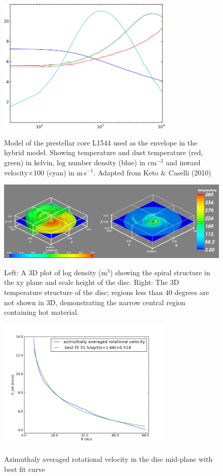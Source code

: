 \documentclass[useAMS,usenatbib]{mn2e}
\begin{document}
\begin{figure}
 \includegraphics[width=84mm]{Figures/model/L1544model_used.png}
 \label{L1544}
 \caption{Model of the prestellar core L1544 used as the envelope in the hybrid model. Showing temperature and dust temperature (red, green) in kelvin, log number density (blue) in cm$^{-3}$ and inward velocity$\times$100 (cyan) in m$\,$s$^{-1}$. Adapted from Keto \& Caselli (2010)}
\end{figure}

\begin{figure}
 \includegraphics[width=168mm]{Figures/model/rhoT2.png}
 \label{rhoT} 
 \caption{Left: A 3D plot of log density (m$^3$) showing the spiral structure in the xy plane and scale height of the disc. Right: The 3D temperature structure of the disc; regions less than 40 degrees are not shown in 3D, demonstrating the narrow central region containing hot material.}
\end{figure}

\begin{figure}
 \includegraphics[width=84mm]{Figures/model/rotational_velocities.png}
 \label{velocity}
 \caption{Azimuthaly averaged rotational velocity in the disc mid-plane with best fit curve}
\end{figure}
\end{document}
